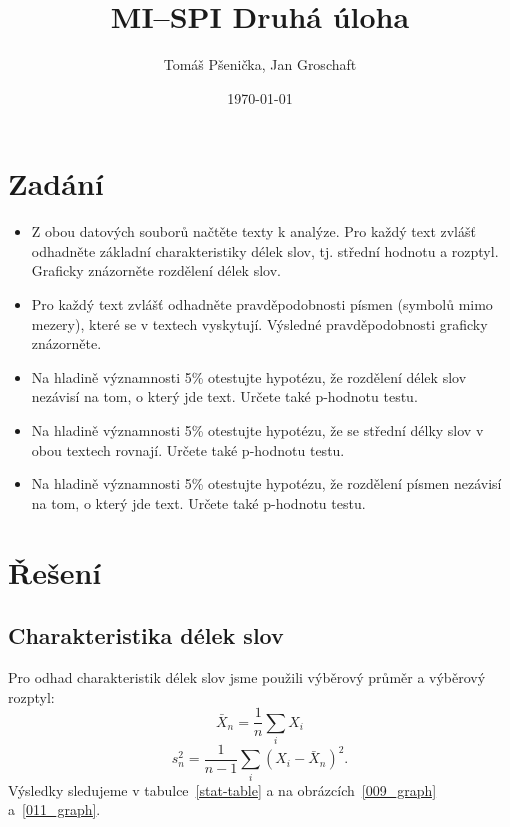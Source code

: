 \documentclass[12pt]{article}
\title{MI--SPI Druhá úloha}
\author{Tomáš Pšenička, Jan Groschaft}
\date{\today}
\begin{document}
 
\begin{titlingpage}
	\maketitle
\end{titlingpage}
 	
	\newpage
 
	\tableofcontents

	\newpage

 	\section{Zadání}
 	
 	\begin{itemize}
 		\item Z obou datových souborů načtěte texty k analýze. Pro každý text zvlášť odhadněte základní charakteristiky délek slov, tj. střední hodnotu a rozptyl. Graficky znázorněte rozdělení délek slov.
  		\item Pro každý text zvlášť odhadněte pravděpodobnosti písmen (symbolů mimo mezery), které se v textech vyskytují. Výsledné pravděpodobnosti graficky znázorněte.
 		\item Na hladině významnosti 5\% otestujte hypotézu, že rozdělení délek slov nezávisí na tom, o který jde text. Určete také p-hodnotu testu. 		
 		\item Na hladině významnosti 5\% otestujte hypotézu, že se střední délky slov v obou textech rovnají. Určete také p-hodnotu testu.
		\item Na hladině významnosti 5\% otestujte hypotézu, že rozdělení písmen nezávisí na tom, o který jde text. Určete také p-hodnotu testu.
 	\end{itemize}
   		
   		
	\section{Řešení}\label{r}
		\subsection{Charakteristika délek slov}\label{pz}
            Pro odhad charakteristik délek slov jsme použili výběrový průměr a výběrový rozptyl: 
               $$\bar{X}_n = \frac{1}{n} \sum_{i}{X_i}$$   					
               $$s_n^2 = \frac{1}{n-1} \sum_{i}{(X_i - \bar{X}_n)^2}.$$
            Výsledky sledujeme v tabulce~\ref{stat-table} a na obrázcích~\ref{009_graph} a~\ref{011_graph}. 
\end{document}
